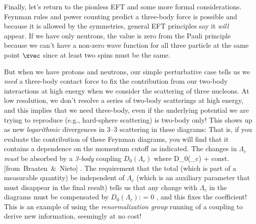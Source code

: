 Finally, let's return to the pionless EFT and some more formal considerations.
Feynman rules and power counting predict a three-body force is possible
and because it is allowed by the symmetries,
general EFT principles say it \emph{will} appear.
If we have only neutrons, the value is zero from the Pauli principle because
we can't have a non-zero
wave function for all three particle at the same point $\xvec$ since at least
two spins must be the same.

But when we have protons and neutrons, 
our simple perturbative case tells us we \emph{need} a three-body
contact force to fix
the contribution from our two-body interactions at high energy when
we consider the scattering of three nucleons.
At low resolution, we don't resolve a series of two-body
scatterings at high energy, 
and this implies that we need three-body, even if the underlying potential
we are trying to reproduce (e.g., hard-sphere scattering) is two-body only!
This shows up as new \emph{logarithmic} divergences in 3--3 scattering
in these diagrams:
     \beq
           \quad   {}
     \eeq
That is, if you evaluate the contribution of these Feynman diagrams, you
will find that it contains a dependence on the momentum cutoff as indicated.     
The changes in $\Lambda_c$ \emph{must} be absorbed by 
a \emph{3-body} coupling $D_0(\Lambda_c)$ where
\beq
   D_0(\Lambda_c) 
       + \mbox{const.}
       \quad \mbox{[from Braaten \& Nieto]}
\eeq.       
The requirement that the total (which is part of a measurable quantity) 
be independent of $\Lambda_c$ (which is an auxiliary parameter that must
disappear in the final result) tells us that any change with $\Lambda_c$
in the diagrams must be compensated by $D_0(\Lambda_c)$:   
  \beq
    \hspace*{-.2in}
     = 0 \;,
  \eeq
and this fixes the coefficient!  This is an example of
using the \emph{renormalization group} running of a coupling
to derive new information, seemingly at no cost!



